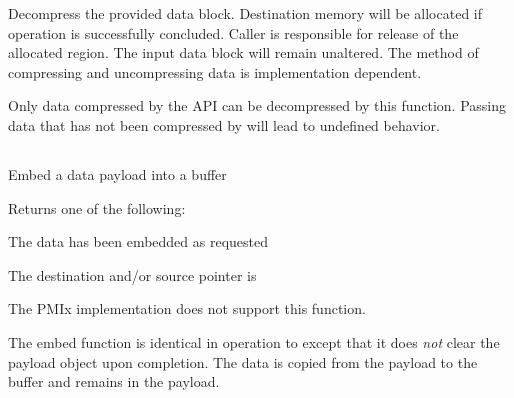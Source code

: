 \descr

Decompress the provided data block. Destination memory
will be allocated if operation is successfully concluded. Caller
is responsible for release of the allocated region. The input
data block will remain unaltered.
The method of compressing and uncompressing data is implementation dependent.

Only data compressed by the  \ac{API}
can be decompressed by this function. Passing data that has not
been compressed by  will lead to
undefined behavior.


\subsection{}

\summary

Embed a data payload into a buffer

\format


\begin{arglist}
\end{arglist}

Returns one of the following:
\begin{constantdesc}
\item {} The data has been embedded as requested
\item {} The destination and/or source pointer is 
\item {} The \ac{PMIx} implementation does not support this function.
\end{constantdesc}

\descr

The embed function is identical in operation to 
except that it does \emph{not} clear the payload object upon completion.  The data is copied from the payload to the buffer and remains in the payload.

